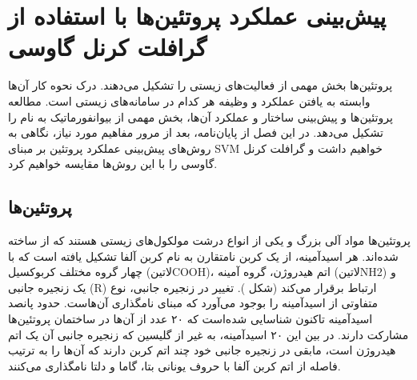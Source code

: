 \chapter{پیش‌بینی عملکرد پروتئین‌ها با استفاده از گرافلت کرنل گاوسی}\label{chap:protein_function_prediction}

پروتئین‌ها بخش مهمی از فعالیت‌های زیستی را تشکیل می‌دهند. درک نحوه کار آن‌ها وابسته به یافتن عملکرد و وظیفه هر کدام در سامانه‌های زیستی است. مطالعه پروتئین‌ها و پیش‌بینی ساختار و عملکرد آن‌ها، بخش مهمی از بیوانفورماتیک به نام  را تشکیل می‌دهد. در این فصل از پایان‌نامه، بعد از مرور مفاهیم مورد نیاز، نگاهی به روش‌های پیش‌بینی عملکرد پروتئین بر مبنای SVM خواهیم داشت و گرافلت کرنل گاوسی را با این روش‌ها مقایسه خواهیم کرد.

\section{پروتئین‌ها}\label{sec:protein-structure}
پروتئین‌ها مواد آلی بزرگ و یکی از انواع درشت مولکول‌های زیستی هستند که از  ساخته شده‌اند. هر اسیدآمینه، از یک کربن نامتقارن به نام کربن آلفا تشکیل یافته است که با چهار گروه مختلف کربوکسیل (‌لاتین{COOH})، اتم هیدروژن، گروه آمینه (‌لاتین{NH2}) و یک زنجیره جانبی (R) ارتباط برقرار می‌کند (شکل ). تغییر در زنجیره جانبی، نوع متفاوتی از اسیدآمینه را بوجود می‌آورد که مبنای نامگذاری آن‌هاست. حدود پانصد اسیدآمینه تاکنون شناسایی شده‌است که ۲۰ عدد از آن‌ها در ساختمان پروتئین‌ها مشارکت دارند. در بین این ۲۰ اسیدآمینه، به غیر از گلیسین که زنجیره جانبی آن یک اتم هیدروژن است، مابقی در زنجیره جانبی خود چند اتم کربن دارند که آن‌ها را به ترتیب فاصله از اتم کربن آلفا با حروف یونانی بتا، گاما و دلتا نامگذاری می‌کنند.

